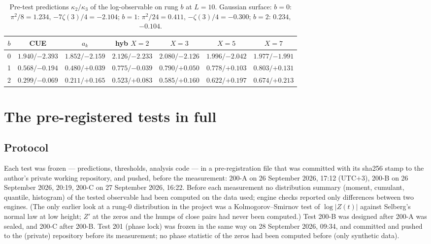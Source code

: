\documentclass[12pt]{amsart}
\theoremstyle{remark}
\newcommand{\1}{\mathbf{1}}
\begin{document}
\begin{table}[h]
\centering
\small
\begin{tabular}{ccccccc}
\toprule
$b$ & CUE & $a_k$ & hyb $X{=}2$ & $X{=}3$ & $X{=}5$ & $X{=}7$\\
\midrule
0 & $1.940/{-2.393}$ & $1.852/{-2.159}$ & $2.126/{-2.233}$ & $2.080/{-2.126}$ & $1.996/{-2.042}$ & $1.977/{-1.991}$\\
1 & $0.568/{-0.194}$ & $0.480/{+0.039}$ & $0.775/{-0.039}$ & $0.790/{+0.050}$ & $0.778/{+0.103}$ & $0.803/{+0.131}$\\
2 & $0.299/{-0.069}$ & $0.211/{+0.165}$ & $0.523/{+0.083}$ & $0.585/{+0.160}$ & $0.622/{+0.197}$ & $0.674/{+0.213}$\\
\bottomrule
\end{tabular}
\caption{\label{tab:models}Pre-test predictions $\kappa_2/\kappa_3$ of the
log-observable on rung $b$ at $L=10$. Gaussian surface: $b=0$:
$\pi^2/8=1.234$, $-7\zeta(3)/4=-2.104$; $b=1$: $\pi^2/24=0.411$,
$-\zeta(3)/4=-0.300$; $b=2$: $0.234$, $-0.104$.}
\end{table}

\section{The pre-registered tests in full}\label{sec:testsupp}

\subsection*{Protocol}
Each test was frozen --- predictions, thresholds, analysis code --- in a
pre-registration file that was committed with its sha256 stamp to the
author's private working repository, and pushed, before the measurement:
200-A on 26 September 2026, 17:12 (UTC$+3$), 200-B on 26
September 2026, 20:19, 200-C on 27 September 2026, 16:22. Before each
measurement no distribution summary (moment, cumulant, quantile,
histogram) of the tested observable had been computed on the data used;
engine checks reported only differences between two engines. (The only
earlier look at a rung-$0$ distribution in the project was a
Kolmogorov--Smirnov test of $\log|Z(t)|$ against Selberg's normal law at
low height; $Z'$ at the zeros and the humps of close pairs had never been
computed.) Test 200-B was designed after 200-A was sealed, and 200-C after
200-B. Test 201 (phase lock) was frozen in the same way on 28 September
2026, 09:34, and committed and pushed to the (private) repository before
its measurement; no phase statistic of the zeros had been computed before
(only synthetic data).
\end{document}
